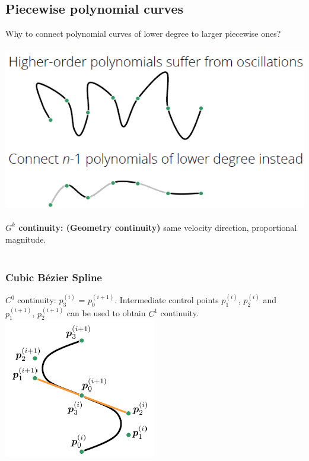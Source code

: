 \documentclass{article}
\begin{document}
\subsection{Piecewise polynomial curves}
Why to connect polynomial curves of lower degree to larger piecewise ones?\\\\
\includegraphics[scale=0.5]{image80.png}\\\\
\textbf{$G^k$ continuity: (Geometry continuity) }same velocity direction, proportional magnitude.\\\\
\subsubsection{Cubic Bézier Spline}
$C^0$ continuity: $p_3^{(i)}$ = $p_0^{(i+1)}$. Intermediate control points $p_1^{(i)}$, $p_2^{(i)}$ and $p_1^{(i+1)}$, $p_2^{(i+1)}$ can be used to obtain $C^1$ continuity.
\includegraphics[scale=0.5]{image81.png}\\\\
\end{document}
